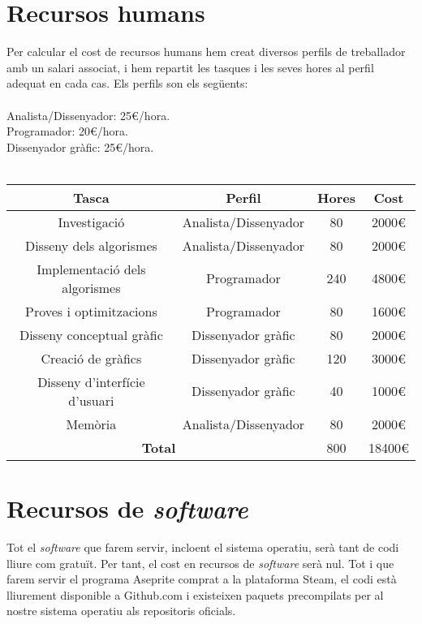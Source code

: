 \section{Recursos humans}
Per calcular el cost de recursos humans hem creat diversos perfils de treballador amb un salari associat, i hem repartit les tasques i les seves hores al perfil adequat en cada cas.
Els perfils son els següents:
\\ \\
Analista/Dissenyador: 25€/hora. \\
Programador: 20€/hora. \\
Dissenyador gràfic: 25€/hora. \\
\\
\begin{center}
  \begin{tabular}{|c|c|c|c|}
    \hline
    Tasca & Perfil & Hores & Cost \\
    \hline \hline
    Investigació & Analista/Dissenyador & 80 & 2000€ \\ \hline
    Disseny dels algorismes & Analista/Dissenyador & 80 & 2000€ \\ \hline
    Implementació dels algorismes & Programador & 240 & 4800€ \\ \hline 
    Proves i optimitzacions & Programador & 80 & 1600€ \\ \hline
    Disseny conceptual gràfic & Dissenyador gràfic & 80 & 2000€ \\ \hline
    Creació de gràfics & Dissenyador gràfic & 120 & 3000€ \\ \hline
    Disseny d'interfície d'usuari & Dissenyador gràfic & 40 & 1000€ \\ \hline
    Memòria & Analista/Dissenyador & 80 & 2000€ \\ \hline
    \hline
    \multicolumn{2}{|c|}{\textbf{Total}} & 800 & 18400€ \\ \hline
  \end{tabular}
\end{center}
\section{Recursos de \textit{software}}
Tot el \textit{software} que farem servir, incloent el sistema operatiu, serà tant de codi lliure com gratuït. Per tant, el cost en recursos de \textit{software} serà nul.
Tot i que farem servir el programa Aseprite comprat a la plataforma Steam, el codi està lliurement disponible a Github.com i existeixen paquets precompilats per al nostre sistema operatiu als repositoris oficials.
